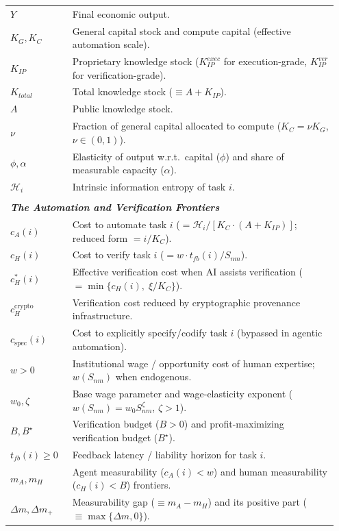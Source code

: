 \documentclass[12pt, letter]{article}
\begin{document}
\begin{longtable}{p{0.18\linewidth} p{0.77\linewidth}}
$Y$ & Final economic output. \\
$K_G, K_C$ & General capital stock and compute capital (effective automation scale). \\
$K_{IP}$ & Proprietary knowledge stock ($K_{IP}^{exec}$ for execution-grade, $K_{IP}^{ver}$ for verification-grade). \\
$K_{total}$ & Total knowledge stock ($\equiv A + K_{IP}$). \\
$A$ & Public knowledge stock. \\
$\nu$ & Fraction of general capital allocated to compute ($K_C = \nu K_G$, $\nu \in (0,1)$). \\
$\phi, \alpha$ & Elasticity of output w.r.t.\ capital ($\phi$) and share of measurable capacity ($\alpha$). \\
$\mathcal{H}_i$ & Intrinsic information entropy of task $i$. \\
\\
\multicolumn{2}{l}{\textbf{\textit{The Automation and Verification Frontiers}}} \\
$c_A(i)$ & Cost to automate task $i$ ($= \mathcal{H}_i / [K_C \cdot (A+K_{IP})]$; reduced form $= i/K_C$). \\
$c_H(i)$ & Cost to verify task $i$ ($= w \cdot t_{fb}(i)/S_{nm}$). \\
$c_H^{\ast}(i)$ & Effective verification cost when AI assists verification ($= \min\{c_H(i),\;\xi/K_C\}$). \\
$c_H^{\text{crypto}}$ & Verification cost reduced by cryptographic provenance infrastructure. \\
$c_{\mathrm{spec}}(i)$ & Cost to explicitly specify/codify task $i$ (bypassed in agentic automation). \\
$w > 0$ & Institutional wage / opportunity cost of human expertise; $w(S_{nm})$ when endogenous. \\
$w_0, \zeta$ & Base wage parameter and wage-elasticity exponent ($w(S_{nm}) = w_0 S_{nm}^\zeta$, $\zeta > 1$). \\
$B, B^\star$ & Verification budget ($B > 0$) and profit-maximizing verification budget ($B^\star$). \\
$t_{fb}(i) \ge 0$ & Feedback latency / liability horizon for task $i$. \\
$m_A, m_H$ & Agent measurability ($c_A(i) < w$) and human measurability ($c_H(i) < B$) frontiers. \\
$\Delta m, \Delta m_+$ & Measurability gap ($\equiv m_A - m_H$) and its positive part ($\equiv \max\{\Delta m, 0\}$). \\

\end{longtable}
\end{document}
